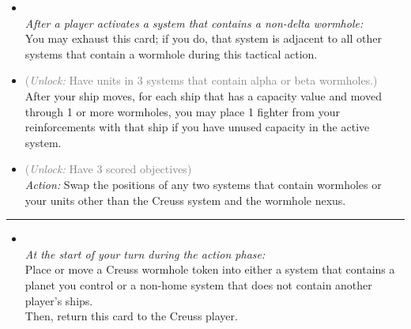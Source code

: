 \begin{multicols}{2}

\begin{itemize}
\item {}\\
\emph{After a player activates a system that contains a non-delta wormhole:}
\\
You may exhaust this card; if you do, that system is adjacent to all other systems that contain a wormhole during this tactical action.
\item {} \textcolor{gray}{(\emph{Unlock:} Have units in 3 systems that contain alpha or beta wormholes.)}\\
After your ship moves, for each ship that has a capacity value and moved through 1 or more wormholes, you may place 1 fighter from your reinforcements with that ship if you have unused capacity in the active system. 
\item {} \textcolor{gray}{(\emph{Unlock:} Have 3 scored objectives)}\\
\emph{Action:} Swap the positions of any two systems that contain wormholes or your units other than the Creuss system and the wormhole nexus.
\end{itemize}

\vspace{-10pt}\rule{\hsize}{0.4pt}\vspace{5pt}


\begin{itemize}
\item {}\\
\emph{At the start of your turn during the action phase:}\\
Place or move a Creuss wormhole token into either a system that contains a planet you control or a non-home system that does not contain another player's ships.\\
Then, return this card to the Creuss player.
\end{itemize}

\end{multicols}



